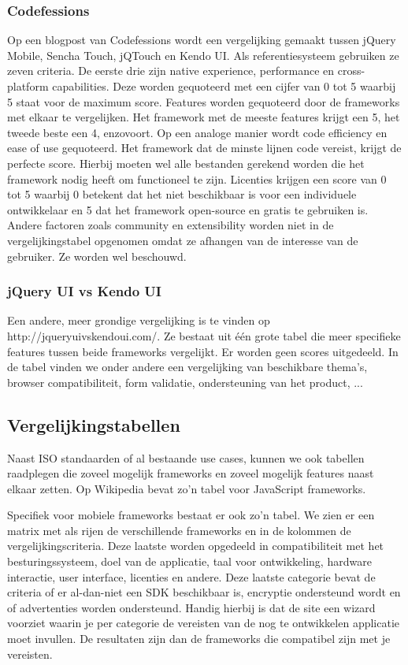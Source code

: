 \subsubsection{Codefessions}
Op een blogpost van Codefessions wordt een vergelijking gemaakt tussen jQuery Mobile, Sencha Touch, jQTouch en Kendo UI.  Als referentiesysteem gebruiken ze zeven criteria.  De eerste drie zijn native experience, performance en cross-platform capabilities.  Deze worden gequoteerd met een cijfer van 0 tot 5 waarbij 5 staat voor de maximum score. Features worden gequoteerd door de frameworks met elkaar te vergelijken.  Het framework met de meeste features krijgt een 5, het tweede beste een 4, enzovoort.  Op een analoge manier wordt code efficiency en ease of use gequoteerd.  Het framework dat de minste lijnen code vereist, krijgt de perfecte score. Hierbij moeten wel alle bestanden gerekend worden die het framework nodig heeft om functioneel te zijn. Licenties krijgen een score van 0 tot 5 waarbij 0 betekent dat het niet beschikbaar is voor een individuele ontwikkelaar en 5 dat het framework open-source en gratis te gebruiken is. Andere factoren zoals community en extensibility worden niet in de vergelijkingstabel opgenomen omdat ze afhangen van de interesse van de gebruiker.  Ze worden wel beschouwd.

\subsubsection{jQuery UI vs Kendo UI}
Een andere, meer grondige vergelijking is te vinden op http://jqueryuivskendoui.com/.  Ze bestaat uit één grote tabel die meer specifieke features tussen beide frameworks vergelijkt.  Er worden geen scores uitgedeeld. In de tabel vinden we onder andere een vergelijking van beschikbare thema's,  browser compatibiliteit,  form validatie,  ondersteuning van het product, ...

\subsection{Vergelijkingstabellen}
Naast ISO standaarden of al bestaande use cases, kunnen we ook tabellen raadplegen die zoveel mogelijk frameworks en zoveel mogelijk features naast elkaar zetten.  Op Wikipedia bevat zo'n tabel voor JavaScript frameworks.  

Specifiek voor mobiele frameworks bestaat er ook zo'n tabel.  We zien er een matrix met als rijen de verschillende frameworks en in de kolommen de vergelijkingscriteria.  Deze laatste worden opgedeeld in compatibiliteit met het besturingssysteem,  doel van de applicatie,  taal voor ontwikkeling,  hardware interactie,  user interface,  licenties en andere.  Deze laatste categorie bevat de criteria of er al-dan-niet een SDK beschikbaar is, encryptie ondersteund wordt en of advertenties worden ondersteund.  Handig hierbij is dat de site een wizard voorziet waarin je per categorie de vereisten van de nog te ontwikkelen applicatie moet invullen.  De resultaten zijn dan de frameworks die compatibel zijn met je vereisten.

